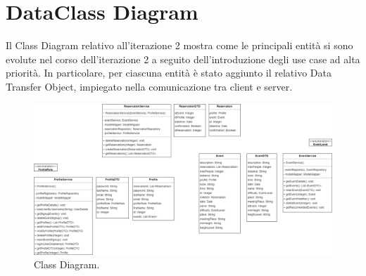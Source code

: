 \section{DataClass Diagram} 
Il Class Diagram relativo all'iterazione 2 mostra come le principali entità si sono evolute nel corso dell'iterazione 2 a seguito dell'introduzione
degli use case ad alta priorità.
In particolare, per ciascuna entità è stato aggiunto il relativo Data Transfer Object, impiegato nella comunicazione tra client e server.
\begin{figure}[h!]
	\centering
	\includegraphics[width=1\textwidth]{Iterazione 2/diagrams/class.drawio.png}
	\caption{Class Diagram.}
	\label{fig:ClassDiagram}
\end{figure}
